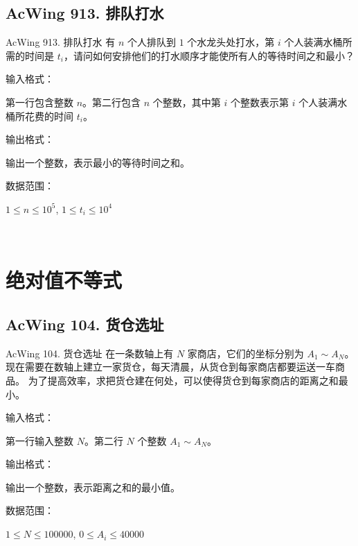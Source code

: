 \subsection{AcWing 913. 排队打水}
\begin{titledbox}{AcWing 913. 排队打水}
    有 $n$ 个人排队到 $1$ 个水龙头处打水，第 $i$ 个人装满水桶所需的时间是 $t_i$，请问如何安排他们的打水顺序才能使所有人的等待时间之和最小？

    输入格式：

    第一行包含整数 $n$。第二行包含 $n$ 个整数，其中第 $i$ 个整数表示第 $i$ 个人装满水桶所花费的时间 $t_i$。

    输出格式：

    输出一个整数，表示最小的等待时间之和。

    数据范围：

    $1 \le n \le 10^5$, $1 \le t_i \le 10^4$

    \begin{inputblock}
         \\
    \end{inputblock}
    \begin{outputblock}
    \end{outputblock}
\end{titledbox}


\section{绝对值不等式}

\subsection{AcWing 104. 货仓选址}
\begin{titledbox}{AcWing 104. 货仓选址}
    在一条数轴上有 $N$ 家商店，它们的坐标分别为 $A_1 \sim A_N$。现在需要在数轴上建立一家货仓，每天清晨，从货仓到每家商店都要运送一车商品。 为了提高效率，求把货仓建在何处，可以使得货仓到每家商店的距离之和最小。

    输入格式：

    第一行输入整数 $N$。第二行 $N$ 个整数 $A_1 \sim A_N$。

    输出格式：

    输出一个整数，表示距离之和的最小值。

    数据范围：

    $1 \le N \le 100000$, $0 \le A_i \le 40000$

    \begin{inputblock}
         \\
    \end{inputblock}
    \begin{outputblock}
    \end{outputblock}
\end{titledbox}


